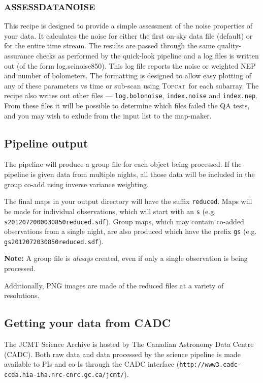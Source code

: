 \documentclass[twoside,11pt]{article}
\newcommand{\htmladdnormallink}[2]{#1}
\newcommand{\xlabel}[1]{}
\renewcommand{\_}{\texttt{\symbol{95}}}
\newcommand{\topcat}{\htmladdnormallink{\textsc{Topcat}}{http://www.starlink.ac.uk/topcat}}
\begin{document}
\subsubsection{\xlabel{assessnoise}ASSESS\_DATA\_NOISE}

This recipe is designed to provide a simple assessment of the noise
properties of your data. It calculates the noise for either the first
on-sky data file (default) or for the entire time stream. The results
are passed through the same quality-assurance checks as performed by
the quick-look pipeline and a log files is written out (of the form
log.scinoise850). This log file reports the noise or weighted NEP and
number of bolometers. The formatting is designed to allow easy
plotting of any of these parameters vs time or sub-scan using \topcat\
for each subarray. The recipe also writes out other files ---
\texttt{log.bolonoise}, \texttt{index.noise} and \texttt{index.nep}.
From these files it will be possible to determine which files failed
the QA tests, and you may wish to exlude from the input list to the
map-maker.

\subsection{\xlabel{pl_output}Pipeline output}

The pipeline will produce a group file for each object being
processed. If the pipeline is given data from multiple nights, all
those data will be included in the group co-add using inverse variance
weighting.

The final maps in your output directory will have the suffix
\texttt{\_reduced}. Maps will be made for individual observations,
which will start with an \texttt{s} (e.g.
\texttt{s20120720\_00030\_850\_reduced.sdf}). Group maps, which may contain
co-added observations from a single night, are also produced which
have the prefix \texttt{gs} (e.g. \texttt{gs20120720\_30\_850\_reduced.sdf}).

\textbf{Note:} A group file is \emph{always} created, even if only a single
observation is being processed.

Additionally, PNG images are made of the reduced files at a variety of
resolutions.

\subsection{\xlabel{cadc}Getting your data from CADC}

The JCMT Science Archive is hosted by The Canadian Astronomy Data
Centre (CADC). Both raw data and data processed by the science pipeline
is made available to PIs and co-Is through the CADC interface
(\texttt{http://www3.cadc-ccda.hia-iha.nrc-cnrc.gc.ca/jcmt/}).
\end{document}
